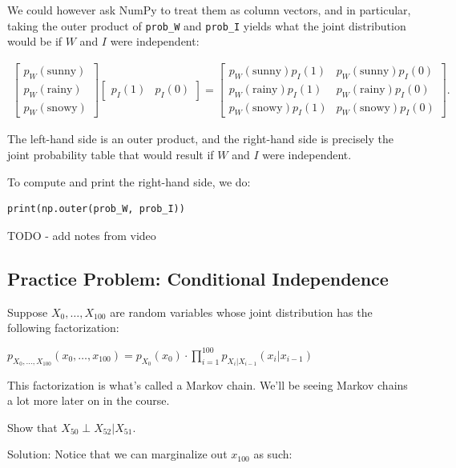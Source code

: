 \documentclass[6008notes.tex]{subfiles}
\begin{document}
We could however ask NumPy to treat them as column vectors, and in particular, taking the outer product of \lstinline{prob_W} and \lstinline{prob_I} yields what the joint distribution would be if $W$ and $I$ were independent:

\begin{eqnarray*}
\begin{bmatrix}
p_W(\text{sunny}) \\
p_W(\text{rainy}) \\
p_W(\text{snowy})
\end{bmatrix}
\begin{bmatrix}
p_I(1) & p_I(0)
\end{bmatrix}
=
\begin{bmatrix}
p_W(\text{sunny})p_I(1) & p_W(\text{sunny})p_I(0) \\
p_W(\text{rainy})p_I(1) & p_W(\text{rainy})p_I(0) \\
p_W(\text{snowy})p_I(1) & p_W(\text{snowy})p_I(0)
\end{bmatrix}.
\end{eqnarray*}

The left-hand side is an outer product, and the right-hand side is precisely the joint probability table that would result if $W$ and $I$ were independent.

To compute and print the right-hand side, we do:

\begin{lstlisting}
print(np.outer(prob_W, prob_I))
\end{lstlisting}

TODO - add notes from video

\subsection{Practice Problem: Conditional Independence}

Suppose $X_0, \dots , X_{100}$ are random variables whose joint distribution has the following factorization:

{\centering$p_{X_0, \dots , X_{100}}(x_0, \dots , x_{100}) = p_{X_0}(x_0) \cdot \prod _{i=1}^{100} p_{X_ i | X_{i-1}}(x_ i | x_{i-1})$ \par}
 
This factorization is what's called a Markov chain. We'll be seeing Markov chains a lot more later on in the course.

Show that $X_{50} \perp X_{52} | X_{51}$.

Solution: Notice that we can marginalize out $x_{100}$ as such:
\end{document}
